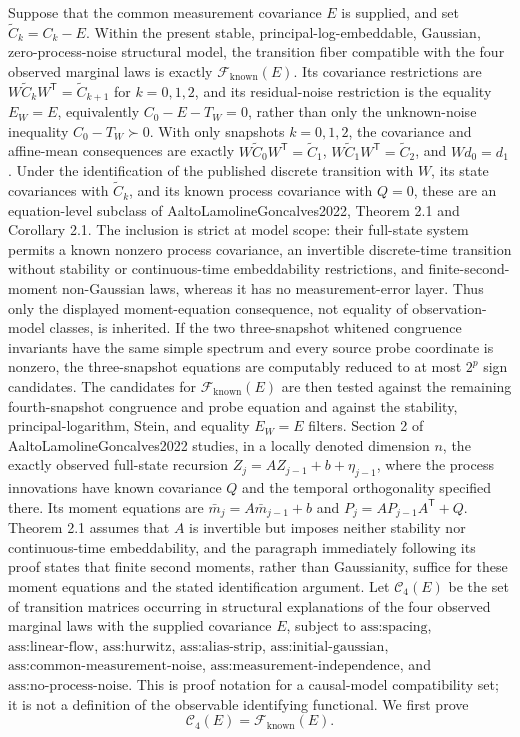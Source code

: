 Suppose that the common measurement covariance \(E\) is supplied, and set \(\widetilde C_k=C_k-E\).  Within the present stable, principal-log-embeddable, Gaussian, zero-process-noise structural model, the transition fiber compatible with the four observed marginal laws is exactly \(\mathcal F_{\mathrm{known}}(E)\).  Its covariance restrictions are \(W\widetilde C_kW^{\mathsf T}=\widetilde C_{k+1}\) for \(k=0,1,2\), and its residual-noise restriction is the equality \(E_W=E\), equivalently \(C_0-E-T_W=0\), rather than only the unknown-noise inequality \(C_0-T_W\succ0\).  With only snapshots \(k=0,1,2\), the covariance and affine-mean consequences are exactly \(W\widetilde C_0W^{\mathsf T}=\widetilde C_1\), \(W\widetilde C_1W^{\mathsf T}=\widetilde C_2\), and \(Wd_0=d_1\).  Under the identification of the published discrete transition with \(W\), its state covariances with \(\widetilde C_k\), and its known process covariance with \(Q=0\), these are an equation-level subclass of AaltoLamolineGoncalves2022, Theorem 2.1 and Corollary 2.1.  The inclusion is strict at model scope: their full-state system permits a known nonzero process covariance, an invertible discrete-time transition without stability or continuous-time embeddability restrictions, and finite-second-moment non-Gaussian laws, whereas it has no measurement-error layer.  Thus only the displayed moment-equation consequence, not equality of observation-model classes, is inherited.  If the two three-snapshot whitened congruence invariants have the same simple spectrum and every source probe coordinate is nonzero, the three-snapshot equations are computably reduced to at most \(2^p\) sign candidates.  The candidates for \(\mathcal F_{\mathrm{known}}(E)\) are then tested against the remaining fourth-snapshot congruence and probe equation and against the stability, principal-logarithm, Stein, and equality \(E_W=E\) filters.
Section 2 of AaltoLamolineGoncalves2022 studies, in a locally denoted dimension \(n\), the exactly observed full-state recursion \(Z_j=A Z_{j-1}+b+\eta_{j-1}\), where the process innovations have known covariance \(Q\) and the temporal orthogonality specified there.  Its moment equations are \(\bar m_j=A\bar m_{j-1}+b\) and \(P_j=AP_{j-1}A^{\mathsf T}+Q\).  Theorem 2.1 assumes that \(A\) is invertible but imposes neither stability nor continuous-time embeddability, and the paragraph immediately following its proof states that finite second moments, rather than Gaussianity, suffice for these moment equations and the stated identification argument.
Let \(\mathcal C_4(E)\) be the set of transition matrices occurring in structural explanations of the four observed marginal laws with the supplied covariance \(E\), subject to \(\text{ass:spacing}\), \(\text{ass:linear-flow}\), \(\text{ass:hurwitz}\), \(\text{ass:alias-strip}\), \(\text{ass:initial-gaussian}\), \(\text{ass:common-measurement-noise}\), \(\text{ass:measurement-independence}\), and \(\text{ass:no-process-noise}\).  This is proof notation for a causal-model compatibility set; it is not a definition of the observable identifying functional.  We first prove
\[
\mathcal C_4(E)=\mathcal F_{\mathrm{known}}(E).
\]

